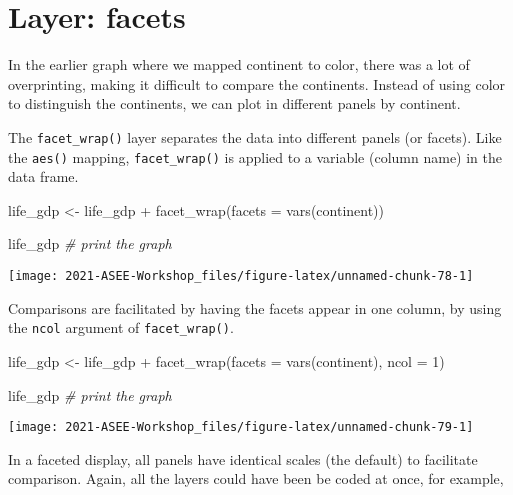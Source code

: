 \documentclass[
]{book}
\newenvironment{Shaded}{\begin{snugshade}}{\end{snugshade}}
\newcommand{\AttributeTok}[1]{\textcolor[rgb]{0.77,0.63,0.00}{#1}}
\newcommand{\CommentTok}[1]{\textcolor[rgb]{0.56,0.35,0.01}{\textit{#1}}}
\newcommand{\DecValTok}[1]{\textcolor[rgb]{0.00,0.00,0.81}{#1}}
\newcommand{\FunctionTok}[1]{\textcolor[rgb]{0.00,0.00,0.00}{#1}}
\newcommand{\NormalTok}[1]{#1}
\newcommand{\OtherTok}[1]{\textcolor[rgb]{0.56,0.35,0.01}{#1}}
\newcommand{\SpecialCharTok}[1]{\textcolor[rgb]{0.00,0.00,0.00}{#1}}
\begin{document}
\hypertarget{layer-facets}{%
\section{Layer: facets}\label{layer-facets}}

In the earlier graph where we mapped continent to color, there was a lot of overprinting, making it difficult to compare the continents. Instead of using color to distinguish the continents, we can plot in different panels by continent.

The \texttt{facet\_wrap()} layer separates the data into different panels (or facets). Like the \texttt{aes()} mapping, \texttt{facet\_wrap()} is applied to a variable (column name) in the data frame.

\begin{Shaded}
\begin{Highlighting}[]
\NormalTok{life\_gdp }\OtherTok{\textless{}{-}}\NormalTok{ life\_gdp }\SpecialCharTok{+} 
  \FunctionTok{facet\_wrap}\NormalTok{(}\AttributeTok{facets =} \FunctionTok{vars}\NormalTok{(continent))}

\NormalTok{life\_gdp }\CommentTok{\# print the graph}
\end{Highlighting}
\end{Shaded}

\texttt{[image: 2021-ASEE-Workshop\_files/figure-latex/unnamed-chunk-78-1]}

Comparisons are facilitated by having the facets appear in one column, by using the \texttt{ncol} argument of \texttt{facet\_wrap()}.

\begin{Shaded}
\begin{Highlighting}[]
\NormalTok{life\_gdp }\OtherTok{\textless{}{-}}\NormalTok{ life\_gdp }\SpecialCharTok{+} \FunctionTok{facet\_wrap}\NormalTok{(}\AttributeTok{facets =} \FunctionTok{vars}\NormalTok{(continent), }\AttributeTok{ncol =} \DecValTok{1}\NormalTok{)}

\NormalTok{life\_gdp }\CommentTok{\# print the graph}
\end{Highlighting}
\end{Shaded}

\texttt{[image: 2021-ASEE-Workshop\_files/figure-latex/unnamed-chunk-79-1]}

In a faceted display, all panels have identical scales (the default) to facilitate comparison. Again, all the layers could have been be coded at once, for example,
\end{document}
